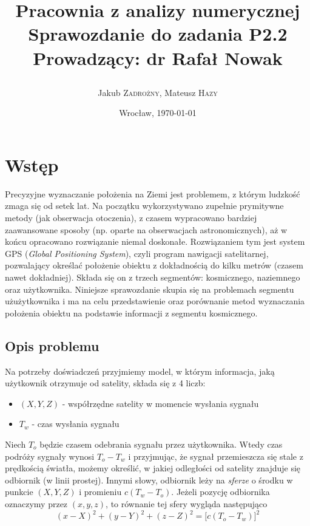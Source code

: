 \documentclass{article}
\title{\LARGE\textbf{Pracownia z analizy numerycznej} \\ Sprawozdanie do zadania \textbf{P2.2} \\
\vskip 0.2cm \large Prowadzący: dr Rafał Nowak\\
\author{ Jakub \textsc{Zadrożny}, Mateusz \textsc{Hazy}}}
\date{Wrocław, \today}
\begin{document}
\maketitle

\section{Wstęp}
Precyzyjne wyznaczanie położenia na Ziemi jest problemem, z którym ludzkość zmaga się od setek lat.
Na początku wykorzystywano zupełnie prymitywne metody (jak obserwacja otoczenia), z czasem wypracowano bardziej
zaawansowane sposoby (np. oparte na obserwacjach astronomicznych), aż w końcu opracowano rozwiązanie niemal doskonałe.
Rozwiązaniem tym jest system GPS (\textit{Global Positioning System}), czyli program nawigacji satelitarnej,
pozwalający określać położenie obiektu z dokładnością do kilku metrów (czasem nawet dokładniej).
Składa się on z trzech segmentów: kosmicznego, naziemnego oraz użytkownika. Niniejsze sprawozdanie skupia się na problemach
segmentu użużytkownika i ma na celu przedstawienie oraz porównanie metod wyznaczania położenia obiektu na podstawie
informacji z segmentu kosmicznego.

\subsection{Opis problemu}
Na potrzeby doświadczeń przyjmiemy model, w którym informacja, jaką użytkownik otrzymuje od satelity,
składa się z 4 liczb:
\begin{itemize}
    \item $(X, Y, Z)$ - współrzędne satelity w momencie wysłania sygnału
	\item $T_w$ - czas wysłania sygnału
\end{itemize}
Niech $T_{o}$ będzie czasem odebrania sygnału przez użytkownika. Wtedy czas podróży sygnały wynosi $T_o - T_w$ i
przyjmując, że sygnał przemieszcza się stale z prędkością światła, możemy określić, w jakiej odległości od satelity
znajduje się odbiornik (w linii prostej). Innymi słowy, odbiornik leży na \textit{sferze} o środku w punkcie $(X, Y, Z)$
i promieniu $c(T_w-T_o)$. Jeżeli pozycję odbiornika oznaczymy przez $(x, y, z)$, to równanie tej sfery wygląda następująco
\[
(x - X)^2 + (y - Y)^2 + (z - Z)^2 = \big[c(T_{o} - T_{w})\big]^2
\]
\end{document}
